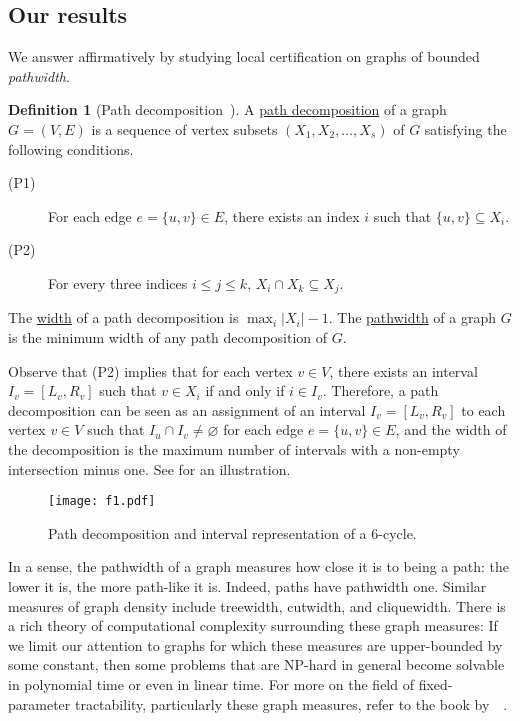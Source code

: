 \documentclass[11pt]{article}
\theoremstyle{definition}
\newtheorem{definition}[lemma]{Definition}
\theoremstyle{remark}
\renewcommand{\emptyset}{\varnothing}
\begin{document}
\subsection{Our results} 

We answer  affirmatively by studying local certification on graphs of bounded \emph{pathwidth}.

\begin{definition}[{Path decomposition~\cite{ROBERTSON198339}}]
    \label{pathwidth-defn}
    A \underline{path decomposition} of a graph $G=(V,E)$ is a sequence of vertex subsets $(X_1, X_2, \ldots, X_s)$ of $G$ satisfying the following conditions.
\begin{description}
    \item[(P1)] For each edge $e=\{u,v\} \in E$, there exists an index $i$ such that $\{u,v\} \subseteq X_i$.
    \item[(P2)] For every three indices $i \leq j \leq k$, $X_i \cap X_k \subseteq X_j$.
\end{description}  
    The \underline{width} of a path decomposition is $\max_{i} |X_i|-1$. The \underline{pathwidth} of a graph $G$ is the minimum width of any path decomposition of $G$.
\end{definition}

Observe that (P2) implies that for each vertex $v \in V$, there exists an interval $I_v = [L_v, R_v]$ such that $v \in X_i$ if and only if $i \in I_v$. Therefore, a path decomposition can be seen as an assignment of an interval $I_v = [L_v, R_v]$ to each vertex $v \in V$ such that $I_u \cap I_v \neq \emptyset$ for each edge $e=\{u,v\} \in E$, and the width of the decomposition is the maximum number of intervals with a non-empty intersection minus one. See  for an illustration.


\begin{figure}[ht!]
    \centering
    \texttt{[image: f1.pdf]}
    \caption{Path decomposition and interval representation of a $6$-cycle.}
    \label{fig:f1}
\end{figure}







In a sense, the pathwidth of a graph measures how close it is to being a path: the lower it is, the more path-like it is. Indeed, paths have pathwidth one. Similar measures of graph density include treewidth, cutwidth, and cliquewidth. There is a rich theory of computational complexity surrounding these graph measures: If we limit our attention to graphs for which these measures are upper-bounded by some constant, then some problems that are NP-hard in general become solvable in polynomial time or even in linear time. For more on the field of fixed-parameter tractability, particularly these graph measures, refer to the book by~\citeauthor{downey27082016}~\cite{downey27082016}.
\end{document}
